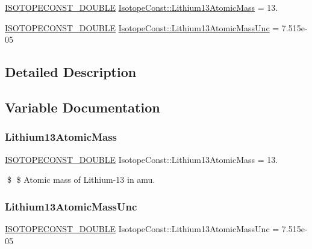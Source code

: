 \begin{DoxyCompactItemize}
\item 
\mbox{\hyperlink{group___isotope_const-_macros_ga8f45a7272ce02c0b4c65c44636ed719a}{I\+S\+O\+T\+O\+P\+E\+C\+O\+N\+S\+T\+\_\+\+D\+O\+U\+B\+LE}} \mbox{\hyperlink{group___isotope_const-_lithium-_li13_ga32b8510812ffbe0df880dc4f2b561d03}{Isotope\+Const\+::\+Lithium13\+Atomic\+Mass}} = 13.
\item 
\mbox{\hyperlink{group___isotope_const-_macros_ga8f45a7272ce02c0b4c65c44636ed719a}{I\+S\+O\+T\+O\+P\+E\+C\+O\+N\+S\+T\+\_\+\+D\+O\+U\+B\+LE}} \mbox{\hyperlink{group___isotope_const-_lithium-_li13_gab8e51056bf03ba5d3bde906d9ed673e7}{Isotope\+Const\+::\+Lithium13\+Atomic\+Mass\+Unc}} = 7.\+515e-\/05
\end{DoxyCompactItemize}


\subsection{Detailed Description}


\subsection{Variable Documentation}
\mbox{\label{group___isotope_const-_lithium-_li13_ga32b8510812ffbe0df880dc4f2b561d03}} 
\subsubsection{\texorpdfstring{Lithium13\+Atomic\+Mass}{Lithium13AtomicMass}}
{\footnotesize\ttfamily \mbox{\hyperlink{group___isotope_const-_macros_ga8f45a7272ce02c0b4c65c44636ed719a}{I\+S\+O\+T\+O\+P\+E\+C\+O\+N\+S\+T\+\_\+\+D\+O\+U\+B\+LE}} Isotope\+Const\+::\+Lithium13\+Atomic\+Mass = 13.}

\$ \$ Atomic mass of Lithium-\/13 in amu. \mbox{\label{group___isotope_const-_lithium-_li13_gab8e51056bf03ba5d3bde906d9ed673e7}} 
\subsubsection{\texorpdfstring{Lithium13\+Atomic\+Mass\+Unc}{Lithium13AtomicMassUnc}}
{\footnotesize\ttfamily \mbox{\hyperlink{group___isotope_const-_macros_ga8f45a7272ce02c0b4c65c44636ed719a}{I\+S\+O\+T\+O\+P\+E\+C\+O\+N\+S\+T\+\_\+\+D\+O\+U\+B\+LE}} Isotope\+Const\+::\+Lithium13\+Atomic\+Mass\+Unc = 7.\+515e-\/05}

